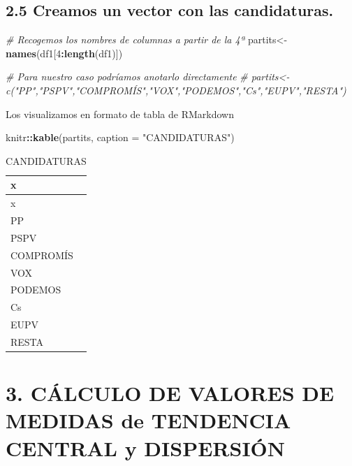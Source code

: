 \documentclass[
]{article}
\newenvironment{Shaded}{\begin{snugshade}}{\end{snugshade}}
\newcommand{\AttributeTok}[1]{\textcolor[rgb]{0.13,0.29,0.53}{#1}}
\newcommand{\CommentTok}[1]{\textcolor[rgb]{0.56,0.35,0.01}{\textit{#1}}}
\newcommand{\DecValTok}[1]{\textcolor[rgb]{0.00,0.00,0.81}{#1}}
\newcommand{\FunctionTok}[1]{\textcolor[rgb]{0.13,0.29,0.53}{\textbf{#1}}}
\newcommand{\NormalTok}[1]{#1}
\newcommand{\OtherTok}[1]{\textcolor[rgb]{0.56,0.35,0.01}{#1}}
\newcommand{\SpecialCharTok}[1]{\textcolor[rgb]{0.81,0.36,0.00}{\textbf{#1}}}
\newcommand{\StringTok}[1]{\textcolor[rgb]{0.31,0.60,0.02}{#1}}
\begin{document}
\hypertarget{creamos-un-vector-con-las-candidaturas.}{%
\subsection{2.5 Creamos un vector con las
candidaturas.}\label{creamos-un-vector-con-las-candidaturas.}}

\begin{Shaded}
\begin{Highlighting}[]
\CommentTok{\# Recogemos los nombres de columnas a partir de la 4ª}
\NormalTok{partits}\OtherTok{\textless{}{-}}\FunctionTok{names}\NormalTok{(df1[}\DecValTok{4}\SpecialCharTok{:}\FunctionTok{length}\NormalTok{(df1)])}

\CommentTok{\# Para nuestro caso podríamos anotarlo directamente}
\CommentTok{\# partits\textless{}{-}c("PP","PSPV","COMPROMÍS","VOX","PODEMOS","Cs","EUPV","RESTA")}
\end{Highlighting}
\end{Shaded}

Los visualizamos en formato de tabla de RMarkdown

\begin{Shaded}
\begin{Highlighting}[]
\NormalTok{knitr}\SpecialCharTok{::}\FunctionTok{kable}\NormalTok{(partits, }\AttributeTok{caption =} \StringTok{"CANDIDATURAS"}\NormalTok{)}
\end{Highlighting}
\end{Shaded}

\begin{longtable}[]{@{}l@{}}
\caption{CANDIDATURAS}\tabularnewline
\toprule\noalign{}
x \\
\midrule\noalign{}
\endfirsthead
\toprule\noalign{}
x \\
\midrule\noalign{}
\endhead
\bottomrule\noalign{}
\endlastfoot
PP \\
PSPV \\
COMPROMÍS \\
VOX \\
PODEMOS \\
Cs \\
EUPV \\
RESTA \\
\end{longtable}

\hypertarget{cuxe1lculo-de-valores-de-medidas-de-tendencia-central-y-dispersiuxf3n}{%
\section{3. CÁLCULO DE VALORES DE MEDIDAS de TENDENCIA CENTRAL y
DISPERSIÓN}\label{cuxe1lculo-de-valores-de-medidas-de-tendencia-central-y-dispersiuxf3n}}
\end{document}
